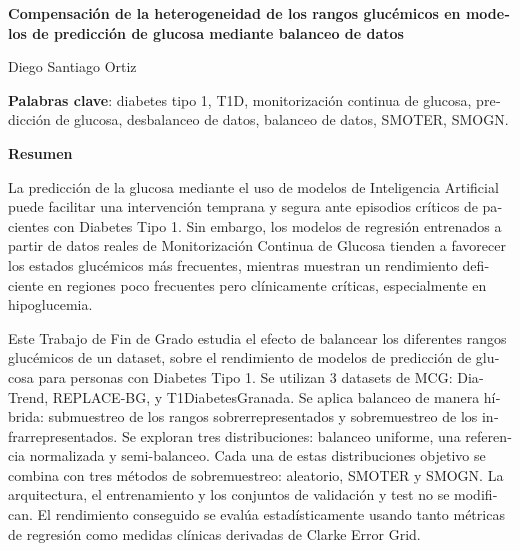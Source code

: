 \cleardoublepage
\thispagestyle{empty}

\begin{otherlanguage}{spanish}

\begin{center}
    {\large\bfseries
    Compensación de la heterogeneidad de los rangos glucémicos en modelos
    de predicción de glucosa mediante balanceo de datos
    \par}

    \vspace{0.5cm}

    Diego Santiago Ortiz
\end{center}

\vspace{0.7cm}

\noindent
\textbf{Palabras clave}: diabetes tipo 1, T1D, monitorización continua de glucosa,
predicción de glucosa, desbalanceo de datos, balanceo de datos, SMOTER, SMOGN.

\vspace{0.7cm}

\noindent
\textbf{Resumen}

\vspace{0.3cm}

La predicción de la glucosa mediante el uso de modelos de Inteligencia Artificial puede facilitar una intervención temprana y segura ante episodios críticos de pacientes con Diabetes Tipo 1. Sin embargo, los modelos de regresión entrenados a partir de datos reales de Monitorización Continua de Glucosa tienden a favorecer los estados glucémicos más frecuentes, mientras muestran un rendimiento deficiente en regiones poco frecuentes pero clínicamente críticas, especialmente en hipoglucemia.

Este Trabajo de Fin de Grado estudia el efecto de balancear los diferentes rangos glucémicos de un dataset, sobre el rendimiento de modelos de predicción de glucosa para personas con Diabetes Tipo 1. Se utilizan 3 datasets de MCG: DiaTrend, REPLACE-BG, y T1DiabetesGranada. Se aplica balanceo de manera híbrida: submuestreo de los rangos sobrerrepresentados y sobremuestreo de los infrarrepresentados. Se exploran tres distribuciones: balanceo uniforme, una referencia normalizada y semi-balanceo. Cada una de estas distribuciones objetivo se combina con tres métodos de sobremuestreo: aleatorio, SMOTER y SMOGN. La arquitectura, el entrenamiento y los conjuntos de validación y test no se modifican. El rendimiento conseguido se evalúa estadísticamente usando tanto métricas de regresión como medidas clínicas derivadas de Clarke Error Grid.


\end{otherlanguage}
